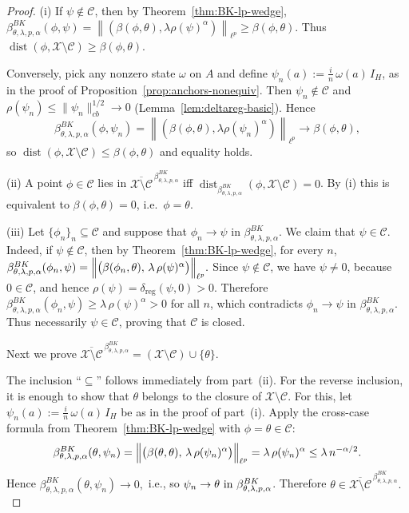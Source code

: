 \documentclass[11pt]{amsart}
\theoremstyle{definition}
\theoremstyle{remark}
\newcommand{\1}{\mathbbm{1}}
\newcommand{\norm}[1]{\left\lVert #1\right\rVert}
\begin{document}
\begin{proof}
(i) If $\psi\notin\mathcal C$, then by Theorem~\ref{thm:BK-lp-wedge}, $\beta^{BK}_{\theta,\lambda,p,\alpha}(\phi,\psi)=\norm{(\beta(\phi,\theta),\lambda\rho(\psi)^\alpha)}_{\ell^p}\ge \beta(\phi,\theta).$
Thus $\operatorname{dist}(\phi,\mathcal X\setminus\mathcal C)\ge \beta(\phi,\theta)$.

Conversely, pick any nonzero state $\omega$ on $A$ and define $\psi_n(a):=\frac{i}{n}\,\omega(a)\,I_H$, as in the proof of Proposition~\ref{prop:anchors-nonequiv}.
Then $\psi_n\notin\mathcal C$ and 
$\rho(\psi_n)\le \|\psi_n\|_{cb}^{1/2}\to 0$ (Lemma~\ref{lem:deltareg-basic}).
Hence
\[
\beta^{BK}_{\theta,\lambda,p,\alpha}(\phi,\psi_n)
=\norm{(\beta(\phi,\theta),\lambda\rho(\psi_n)^\alpha)}_{\ell^p}\longrightarrow \beta(\phi,\theta),
\]
so $\operatorname{dist}(\phi,\mathcal X\setminus\mathcal C)\le \beta(\phi,\theta)$ and equality holds.


(ii) A point $\phi\in\mathcal C$ lies in $\overline{\mathcal X\setminus\mathcal C}^{\,\beta^{BK}_{\theta,\lambda,p,\alpha}}$ iff
$\operatorname{dist}_{\beta^{BK}_{\theta,\lambda,p,\alpha}}(\phi,\mathcal X\setminus\mathcal C)=0$.
By (i) this is equivalent to $\beta(\phi,\theta)=0$, i.e.\ $\phi=\theta$.

(iii) Let $\{\phi_n\}_{n}\subseteq \mathcal C$ and suppose that $\phi_n\to\psi$ in $\beta^{BK}_{\theta,\lambda,p,\alpha}.$
We claim that \(\psi\in\mathcal C\). Indeed, if $\psi\notin\mathcal C$, then by Theorem~\ref{thm:BK-lp-wedge}, for every \(n\),
$\beta^{BK}_{\theta,\lambda,p,\alpha}(\phi_n,\psi)=
\Bigl\|\bigl(\beta(\phi_n,\theta),\,\lambda\,\rho(\psi)^\alpha\bigr)\Bigr\|_{\ell^p}.$
Since $\psi\notin\mathcal C$, we have $\psi\neq 0$, because $0\in\mathcal C$, and hence $\rho(\psi)=\delta_{\mathrm{reg}}(\psi,0)>0.$
Therefore $\beta^{BK}_{\theta,\lambda,p,\alpha}(\phi_n,\psi)
\ge
\lambda\,\rho(\psi)^\alpha
>0$ for all $n$,
which contradicts \(\phi_n\to\psi\) in \(\beta^{BK}_{\theta,\lambda,p,\alpha}\).
Thus necessarily \(\psi\in\mathcal C\), proving that \(\mathcal C\) is closed.

Next we prove $\overline{\mathcal X\setminus\mathcal C}^{\,\beta^{BK}_{\theta,\lambda,p,\alpha}}
=
(\mathcal X\setminus\mathcal C)\cup\{\theta\}.$

The inclusion ``$\subseteq$'' follows immediately from part~(ii). 
For the reverse inclusion, it is enough to show that \(\theta\) belongs to the closure of
\(\mathcal X\setminus\mathcal C\). For this, let $\psi_n(a):=\frac{i}{n}\,\omega(a)\,I_H$ be as in the proof of part~(i). Apply the cross-case formula from Theorem~\ref{thm:BK-lp-wedge} with \(\phi=\theta\in\mathcal C\):
\[
\beta^{BK}_{\theta,\lambda,p,\alpha}(\theta,\psi_n)
=
\Bigl\|\bigl(\beta(\theta,\theta),\,\lambda\,\rho(\psi_n)^\alpha\bigr)\Bigr\|_{\ell^p}
=
\lambda\,\rho(\psi_n)^\alpha
\le
\lambda\,n^{-\alpha/2}.
\]
Hence $\beta^{BK}_{\theta,\lambda,p,\alpha}(\theta,\psi_n)\to 0,$ i.e., 
so $\psi_n\to\theta\) in \(\beta^{BK}_{\theta,\lambda,p,\alpha}$.
Therefore $\theta\in
\overline{\mathcal X\setminus\mathcal C}^{\,\beta^{BK}_{\theta,\lambda,p,\alpha}}.$
\end{proof}
\end{document}
